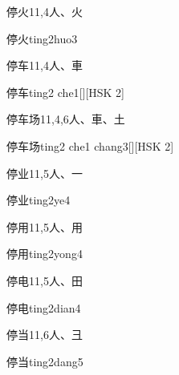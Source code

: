 \begin{entry}{停火}{11,4}{⼈、⽕}
  \begin{phonetics}{停火}{ting2huo3}
  \end{phonetics}
\end{entry}

\begin{entry}{停车}{11,4}{⼈、⾞}
  \begin{phonetics}{停车}{ting2 che1}[][HSK 2]
  \end{phonetics}
\end{entry}

\begin{entry}{停车场}{11,4,6}{⼈、⾞、⼟}
  \begin{phonetics}{停车场}{ting2 che1 chang3}[][HSK 2]
  \end{phonetics}
\end{entry}

\begin{entry}{停业}{11,5}{⼈、⼀}
  \begin{phonetics}{停业}{ting2ye4}
  \end{phonetics}
\end{entry}

\begin{entry}{停用}{11,5}{⼈、⽤}
  \begin{phonetics}{停用}{ting2yong4}
  \end{phonetics}
\end{entry}

\begin{entry}{停电}{11,5}{⼈、⽥}
  \begin{phonetics}{停电}{ting2dian4}
  \end{phonetics}
\end{entry}

\begin{entry}{停当}{11,6}{⼈、⼹}
  \begin{phonetics}{停当}{ting2dang5}
  \end{phonetics}
\end{entry}

